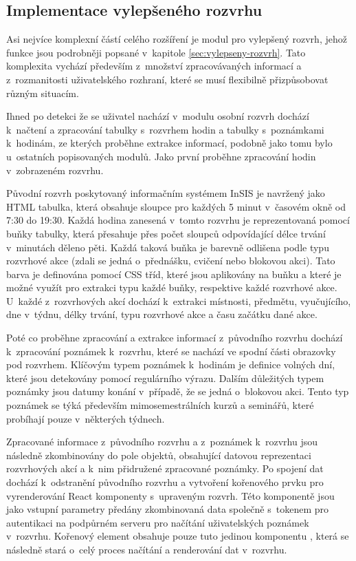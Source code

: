 \subsection{Implementace vylepšeného rozvrhu}

Asi nejvíce komplexní částí celého rozšíření je modul pro vylepšený rozvrh, jehož funkce jsou podrobněji popsané v~kapitole \ref{sec:vylepseny-rozvrh}. Tato komplexita vychází především z~množství zpracovávaných informací a z~rozmanitosti uživatelského rozhraní, které se musí flexibilně přizpůsobovat různým situacím. 

Ihned po detekci že se uživatel nachází v~modulu osobní rozvrh dochází k~načtení a zpracování tabulky s~rozvrhem hodin a tabulky s~poznámkami k~hodinám, ze kterých proběhne extrakce informací, podobně jako tomu bylo u~ostatních popisovaných modulů. Jako první proběhne zpracování hodin v~zobrazeném rozvrhu. 

Původní rozvrh poskytovaný informačním systémem InSIS je navržený jako HTML tabulka, která obsahuje sloupce pro každých 5 minut v~časovém okně od 7:30 do 19:30. Každá hodina zanesená v~tomto rozvrhu je reprezentovaná pomocí buňky tabulky, která přesahuje přes počet sloupců odpovídající délce trvání v~minutách děleno pěti. Každá taková buňka je barevně odlišena podle typu rozvrhové akce (zdali se jedná o~přednášku, cvičení nebo blokovou akci). Tato barva je definována pomocí CSS tříd, které jsou aplikovány na buňku a které je možné využít pro extrakci typu každé buňky, respektive každé rozvrhové akce. U~každé z~rozvrhových akcí dochází k~extrakci místnosti, předmětu, vyučujícího, dne v~týdnu, délky trvání, typu rozvrhové akce a času začátku dané akce.

Poté co proběhne zpracování a extrakce informací z~původního rozvrhu dochází k~zpracování poznámek k~rozvrhu, které se nachází ve spodní části obrazovky pod rozvrhem. Klíčovým typem poznámek k~hodinám je definice volných dní, které jsou detekovány pomocí regulárního výrazu. Dalším důležitých typem poznámky jsou datumy konání v~případě, že se jedná o~blokovou akci. Tento typ poznámek se týká především mimosemestrálních kurzů a seminářů, které probíhají pouze v~některých týdnech.

Zpracované informace z~původního rozvrhu a z~poznámek k~rozvrhu jsou následně zkombinovány do pole objektů, obsahující datovou reprezentaci rozvrhových akcí a k~nim přidružené zpracované poznámky. Po spojení dat dochází k~odstranění původního rozvrhu a vytvoření kořenového prvku pro vyrenderování React komponenty s~upraveným rozvrh. Této komponentě jsou jako vstupní parametry předány zkombinovaná data společně s~tokenem pro autentikaci na podpůrném serveru pro načítání uživatelských poznámek v~rozvrhu. Kořenový element obsahuje pouze tuto jedinou komponentu , která se následně stará o~celý proces načítání a renderování dat v~rozvrhu.

